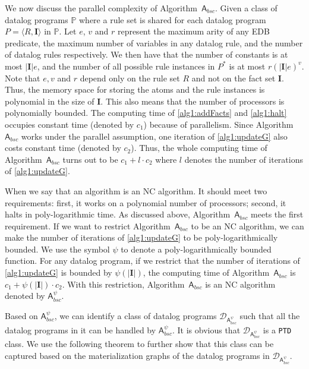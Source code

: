 \documentclass[final,1p,times]{elsarticle}
\begin{document}
We now discuss the parallel complexity of Algorithm~$\mathsf{A}_{bsc}$.
Given a class of datalog programs $\mathbb{P}$ where
a rule set is shared for each datalog program $P=\langle R, \textbf{I}\rangle$ in $\mathbb{P}$.
Let $e$, $v$ and $r$ represent the maximum arity of any EDB predicate, the maximum number of variables
in any datalog rule, and the number of datalog rules respectively.
We then have that the number of
constants is at most $|\textbf{I}|e$, and the number of all possible rule instances in $P^*$
is at most $r(|\textbf{I}|e)^v$.
Note that $e, v$ and $r$ depend only on the rule set $R$ and not on the fact set $\textbf{I}$.
Thus, the memory space for storing the atoms and the rule instances is polynomial in the size of $\textbf{I}$.
This also means that the number of processors is polynomially bounded.
The computing time of \ref{alg1:addFacts} and \ref{alg1:halt} occupies constant time (denoted by $c_1$) because of parallelism.
Since Algorithm~$\mathsf{A}_{bsc}$ works under the parallel assumption, one iteration of
\ref{alg1:updateG} also costs constant time (denoted by $c_2$). Thus, 
the whole computing time of Algorithm~$\mathsf{A}_{bsc}$ turns out to be $c_1+l\cdot c_2$
where $l$ denotes the number of iterations of \ref{alg1:updateG}.

When we say that an algorithm is an NC algorithm. It should meet two requirements: first,
it works on a polynomial number of processors; second, it halts in poly-logarithmic time.
As discussed above, Algorithm~$\mathsf{A}_{bsc}$ meets the first requirement.
If we want to restrict Algorithm~$\mathsf{A}_{bsc}$ to be an NC algorithm,
we can make the number of iterations of \ref{alg1:updateG} to be poly-logarithmically bounded.
We use the symbol $\psi$ to denote a poly-logarithmically bounded function.
For any datalog program, if we restrict that the number of iterations of \ref{alg1:updateG} is bounded by $\psi(|\textbf{I}|)$, 
the computing time of Algorithm~$\mathsf{A}_{bsc}$
is $c_1+\psi(|\textbf{I}|)\cdot c_2$. With this restriction, Algorithm~$\mathsf{A}_{bsc}$ is an NC algorithm denoted by
$\mathsf{A}_{bsc}^{\psi}$.

Based on $\mathsf{A}_{bsc}^{\psi}$, we can identify a class of datalog programs
$\mathcal{D}_{\mathsf{A}_{bsc}^{\psi}}$ such that all the datalog programs in it can be handled
by $\mathsf{A}_{bsc}^{\psi}$.
It is obvious that $\mathcal{D}_{\mathsf{A}_{bsc}^{\psi}}$ is a \texttt{PTD} class.
We use the following theorem to further show that this class can be captured based on
the materialization graphs of the datalog programs in $\mathcal{D}_{\mathsf{A}_{bsc}^{\psi}}$.
\end{document}
